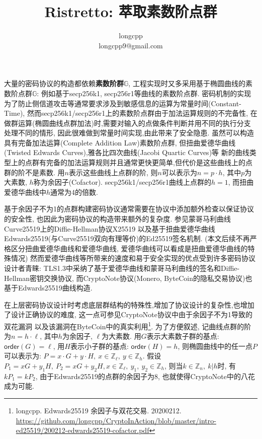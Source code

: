 \documentclass{article}
\renewcommand{\G}{\mathbb{G}}
\newcommand{\Z}{\mathbb{Z}}
\newcommand{\order}{\textsf{order}}
\begin{document}
\title{Ristretto: 萃取素数阶点群}
\author{longcpp \\ \small{longcpp9@gmail.com}}

\maketitle

大量的密码协议的构造都依赖\textbf{素数阶群$\G$}, 工程实现时又多采用基于椭圆曲线的素数阶点群$\G$:
例如基于secp256k1, secp256r1等曲线的素数阶点群.
密码机制的实现为了防止侧信道攻击等通常要求涉及到敏感信息的运算为常量时间(Constant-Time),
然而secp256k1/secp256r1上的素数阶点群由于加法运算规则的不完备性,
在做群运算(椭圆曲线点群加法)时,需要对输入的点做条件判断并用不同的执行分支处理不同的情形,
因此很难做到常量时间实现,由此带来了安全隐患. 
虽然可以构造具有完备加法运算(Complete Addition Law)素数阶点群,
但扭曲爱德华曲线(Twisted Edwards Curves),雅各比四次曲线(Jacobi Quartic Curves)等
新的曲线类型上的点群有完备的加法运算规则并且通常更快更简单,但代价是这些曲线上的点群的阶不是素数.
用$n$表示这些曲线上点群的阶, 则$n$可以表示为$n = p \cdot h$, 
其中$p$为大素数, $h$称为余因子(Cofactor).
secp256k1/secp256r1曲线上点群的$h = 1$, 而扭曲爱德华曲线中$h$通常为4的倍数.

基于余因子不为1的点群构建密码协议通常需要在协议中添加额外检查以保证协议的安全性,
也因此为密码协议的构造带来额外的复杂度. 参见蒙哥马利曲线Curve25519上的Diffie-Hellman协议X25519
以及基于扭曲爱德华曲线Edwards25519(与Curve25519双向有理等价)的Ed25519签名机制.
(本文后续不再严格区分扭曲爱德华曲线和爱德华曲线, 爱德华曲线可以看成是扭曲爱德华曲线的特殊情况)
然而爱德华曲线等所带来的速度和易于安全实现的优点受到许多密码协议设计者青睐:
TLS1.3中采纳了基于爱德华曲线和蒙哥马利曲线的签名和Diffie-Hellman密钥交换协议,
而CryptoNote协议(Monero, ByteCoin的隐私交易协议)也基于Edwards25519曲线构造.

在上层密码协议设计时考虑底层群结构的特殊性,增加了协议设计的复杂性,也增加了设计正确协议的难度,
这一点可参见CryptoNote协议中由于余因子不为1导致的双花漏洞
以及该漏洞在ByteCoin中的真实利用\footnote{longcpp. Edwards25519 余因子与双花交易. 20200212. 
\url{https://github.com/longcpp/CryptoInAction/blob/master/intro-ed25519/200212-edwards25519-cofactor.pdf}}.
为了方便叙述, 记曲线点群的阶为$n = h\cdot\ell$, 其中$h$为余因子, $\ell$为大素数.
用$G$表示大素数子群的基点: $\order(G) = \ell$, 用$H$表示小子群的基点: $\order(H) = h$,
则椭圆曲线中的任一点$P$可以表示为: $P = x\cdot G + y \cdot H,~x\in\Z_\ell,~y\in\Z_h$.
假设$P_1 = xG + y_1H,\ P_2 = xG + y_2H, x\in\Z_\ell,~y_1,~y_2\in\Z_h$,
则当$k\in\Z_n,~k | h$时, 有$kP_1 = kP_2$, 
由于Edwards25519的点群的余因子为8, 也就使得CryptoNote中的八花成为可能.
\end{document}

